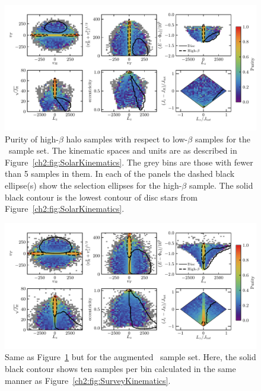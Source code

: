 \begin{figure}
	\centering
	\includegraphics[width=\textwidth]{figure/ch2/SolarHaloPurityGrid.pdf}
	\caption{Purity of high-$\beta$ halo samples with respect to low-$\beta$ samples for the \solar\ sample set. The kinematic spaces and units are as described in Figure~\ref{ch2:fig:SolarKinematics}. The grey bins are those with fewer than 5 samples in them. In each of the panels the dashed black ellipse(s) show the selection ellipses for the high-$\beta$ sample. The solid black contour is the lowest contour of disc stars from Figure~\ref{ch2:fig:SolarKinematics}.}
	\label{ch2:fig:SolarHaloPurity}
\end{figure}

\begin{figure}
	\centering
	\includegraphics[width=\textwidth]{figure/ch2/SurveyHaloPurityGrid.pdf}
	\caption{Same as Figure~\ref{ch2:fig:SolarHaloPurity} but for the augmented \survey\ sample set. Here, the solid black contour shows ten samples per bin calculated in the same manner as Figure~\ref{ch2:fig:SurveyKinematics}.}
	\label{ch2:fig:SurveyHaloPurity}
\end{figure}

